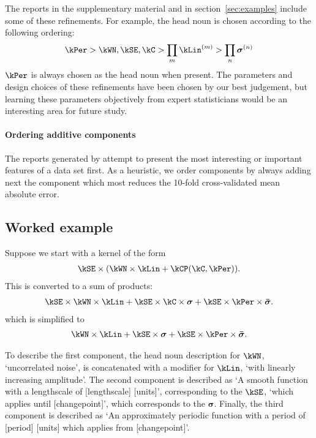 The reports in the supplementary material and in section~\ref{sec:examples} include some of these refinements.
For example, the head noun is chosen according to the following ordering:
\begin{align*}
\kPer > \kWN, \kSE, \kC > \prod_m \kLin^{(m)} > \prod_n \boldsymbol\sigma^{(n)}
\end{align*}
\ie $\kPer$ is always chosen as the head noun when present.
The parameters and design choices of these refinements have been chosen by our best judgement, but learning these parameters objectively from expert statisticians would be an interesting area for future study.

\paragraph{Ordering additive components}

The reports generated by \procedurename{} attempt to present the most interesting or important features of a data set first.
As a heuristic, we order components by always adding next the component which most reduces the 10-fold cross-validated mean absolute error.

\subsection{Worked example}

Suppose we start with a kernel of the form
\begin{align*}
\kSE \times (\kWN \times \kLin + \kCP(\kC, \kPer)).
\end{align*}
This is converted to a sum of products:
\begin{align*}
\kSE \times \kWN \times \kLin + \kSE \times \kC \times \boldsymbol{\sigma} + \kSE \times \kPer \times \boldsymbol{\bar\sigma}.
\end{align*}
which is simplified to
\begin{align*}
\kWN \times \kLin + \kSE \times \boldsymbol{\sigma} + \kSE \times \kPer \times \boldsymbol{\bar\sigma}.
\end{align*}

To describe the first component, the head noun description for $\kWN$, `uncorrelated noise', is concatenated with a modifier for $\kLin$, `with linearly increasing amplitude'.
The second component is described as `A smooth function with a lengthscale of [lengthscale] [units]', corresponding to the $\kSE$, `which applies until [changepoint]', which corresponds to the $\boldsymbol{\sigma}$.
Finally, the third component is described as `An approximately periodic function with a period of [period] [units] which applies from [changepoint]'.


